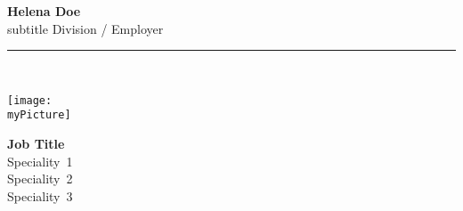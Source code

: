 \documentclass[11pt,a4paper]{memoir}
\newcommand{\myPicture}{%
avatars-material-woman-4%
}
\newcommand{\myName}{%
Helena Doe%
}
\begin{document}
    \begin{Spacing}{1}%
    \noindent
    \textbf{\myName}\\
    \tiny{subtitle}%
    \hfill {\color{gray}
    {%
    \tiny{Division / Employer}%
    }%
    }\\ 
    \rule{\textwidth}{.3mm}\\
    \begin{minipage}[t]{33mm}
        \vspace{-0mm}%
        \texttt{[image: \\myPicture]}
    \end{minipage}
    \hspace{1mm}
    \begin{minipage}[t]{42mm}
        \vspace{-0mm}%
        \begin{flushleft}
        {\scriptsize
            \begin{Spacing}{1}%
            \textbf{Job Title}\\%
            \vspace{1mm}
                \mbox{Speciality 1}\\%
                \mbox{Speciality 2}\\
                \mbox{Speciality 3}
            \vspace{1mm}\\
            \end{Spacing}
        }
\newcommand{\websiteItem}{{}\\}
\def \websiteUrl {https://fqdn/}%
\renewcommand{\websiteItem}{%
    {\color{gray}website} & 
    \href{\websiteUrl{}}
    {\websiteUrl{}}\\
}


\end{flushleft}
\end{minipage}
\end{Spacing}
\end{document}
